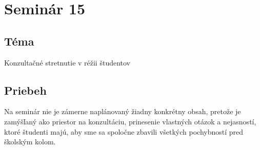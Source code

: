 \section*{Seminár 15}


\subsection*{Téma}
Konzultačné stretnutie v réžii študentov

\subsection*{Priebeh}

Na seminár nie je zámerne naplánovaný žiadny konkrétny obsah, pretože je zamýšľaný ako priestor na konzultáciu, prinesenie vlastných otázok a nejasností, ktoré študenti majú, aby sme sa spoločne zbavili všetkých pochybností pred školským kolom.


